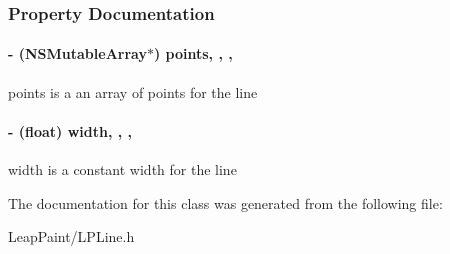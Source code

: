 \subsubsection{Property Documentation}
\hypertarget{interface_l_p_line_a3f5edffc9c461de1a0cbda01de250bd2}{
\paragraph[{points}]{\setlength{\rightskip}{0pt plus 5cm}-\/ (N\-S\-Mutable\-Array$\ast$) points\hspace{0.3cm}{\ttfamily [read]}, {\ttfamily [write]}, {\ttfamily [nonatomic]}, {\ttfamily [strong]}}}\label{df/dbc/interface_l_p_line_a3f5edffc9c461de1a0cbda01de250bd2}
points is a an array of points for the line \hypertarget{interface_l_p_line_a4d06bc7cac330ed07213cb50229313fd}{
\paragraph[{width}]{\setlength{\rightskip}{0pt plus 5cm}-\/ (float) width\hspace{0.3cm}{\ttfamily [read]}, {\ttfamily [write]}, {\ttfamily [nonatomic]}, {\ttfamily [assign]}}}\label{df/dbc/interface_l_p_line_a4d06bc7cac330ed07213cb50229313fd}
width is a constant width for the line 

The documentation for this class was generated from the following file\-:\begin{DoxyCompactItemize}
\item 
Leap\-Paint/L\-P\-Line.\-h\end{DoxyCompactItemize}
